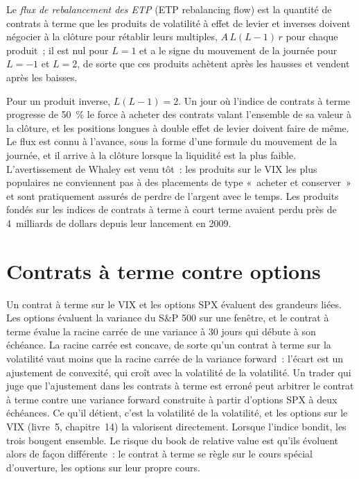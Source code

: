 \begin{definition}\label{def:s2:the-volatility-index-complex:flow}
Le \emph{flux de rebalancement des ETP} (ETP rebalancing flow) est la quantité de contrats à terme que les produits de volatilité à effet de levier et inverses doivent négocier à
la clôture pour rétablir leurs multiples, $A\,L(L - 1)\,r$ pour chaque produit~; il est nul pour $L = 1$ et a le signe du mouvement de la journée pour $L = -1$ et
$L = 2$, de sorte que ces produits achètent après les hausses et vendent après les baisses.
\end{definition}

Pour un produit inverse, $L(L - 1) = 2$. Un jour où l'indice de contrats à terme progresse de 50~\% le force à acheter des contrats valant l'ensemble de sa valeur à la clôture, et
les positions longues à double effet de levier doivent faire de même. Le flux est connu à l'avance, sous la forme d'une formule du mouvement de la journée, et il arrive à la clôture lorsque la liquidité est
la plus faible. L'avertissement de Whaley est venu tôt~: les produits sur le VIX les plus populaires ne conviennent pas à des placements de type «~acheter et conserver~» et sont pratiquement assurés de perdre
de l'argent avec le temps. Les produits fondés sur les indices de contrats à terme à court terme avaient perdu près de 4~milliards de dollars depuis leur lancement en 2009.

\section{Contrats à terme contre options}

Un contrat à terme sur le VIX et les options SPX évaluent des grandeurs liées. Les options évaluent la variance du S\&P 500 sur une fenêtre, et le contrat à terme évalue la racine carrée de
une variance à 30 jours qui débute à son échéance. La racine carrée est concave, de sorte qu'un contrat à terme sur la volatilité vaut moins que la racine carrée de la
variance forward~: l'écart est un ajustement de convexité, qui croît avec la volatilité de la volatilité. Un trader qui juge que l'ajustement dans les contrats à terme
est erroné peut arbitrer le contrat à terme contre une variance forward construite à partir d'options SPX à deux échéances. Ce qu'il détient, c'est la volatilité de
la volatilité, et les options sur le VIX (livre~5, chapitre~14) la valorisent directement. Lorsque l'indice bondit, les trois bougent ensemble. Le risque du book de relative value est
qu'ils évoluent alors de façon différente~: le contrat à terme se règle sur le cours spécial d'ouverture, les options sur leur propre cours.

